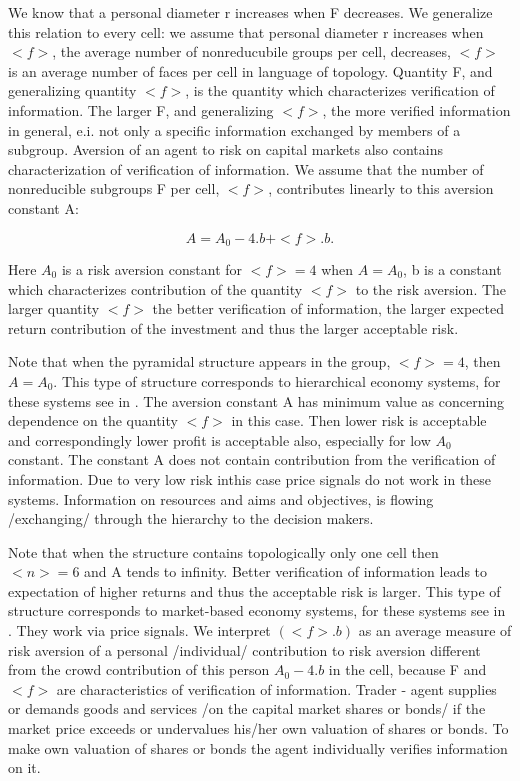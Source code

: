 \documentclass[10pt]{article}
\begin{document}
We know \cite{5}  that a personal diameter r increases when F decreases. We generalize this relation to every cell: we assume that personal diameter r increases when $<f>$, the average number of nonreducubile groups per cell, decreases, $<f>$ is an average number of faces per cell in language of topology. Quantity F, and generalizing quantity $<f>$, is the quantity which characterizes verification of information. The larger F, and generalizing $ <f> $, the more verified information in general, e.i. not only a specific information exchanged by members of a subgroup. Aversion of an agent to risk on capital
markets also contains characterization of verification of information. We assume that the number of nonreducible subgroups F per cell, $<f>$, contributes linearly to this aversion constant A:

\begin{equation}
\label{1}
A = A_{0} - 4.b + <f>.b .
\end{equation}

Here $ A_{0}$ is a risk aversion constant for $<f> = 4$ when $A = A_{0} $, b is a constant which characterizes contribution
of the quantity $<f>$ to the risk aversion. The larger quantity $<f>$ the better verification of information, the larger expected return contribution of the investment and thus the larger acceptable risk.


Note that when the pyramidal structure appears in the group, $<f> = 4$, then $A = A_{0} $.
This type of structure  corresponds to hierarchical economy systems, for these systems see in \cite{6}. The aversion constant A has minimum value as concerning dependence on the quantity $ <f> $ in this case. Then lower risk is acceptable and correspondingly lower profit is acceptable also, especially for low $ A_{0} $ constant. The constant A does not contain contribution from the verification of information. Due to very low risk inthis case price signals do not work in these systems. Information on resources and aims and objectives, is flowing /exchanging/ through the hierarchy to the decision makers.


Note that when the structure
contains topologically only one cell then $<n> = 6$ and A tends to infinity. Better verification of information leads to expectation of higher returns and thus the acceptable risk is larger.
This type of structure  corresponds to market-based economy systems, for these systems see in \cite{6}. They work via price signals.
We interpret $(<f>.b)$ as an average measure of risk aversion of a personal /individual/ contribution to risk aversion different from the crowd contribution of this person $ A_{0} - 4.b $ in the cell, because F and $<f>$ are characteristics of verification of information. Trader - agent supplies or demands goods and services /on the capital market shares or bonds/ if the market price exceeds or undervalues his/her own valuation of shares or bonds. To make own valuation of shares or bonds the agent individually verifies information on it.
\end{document}
